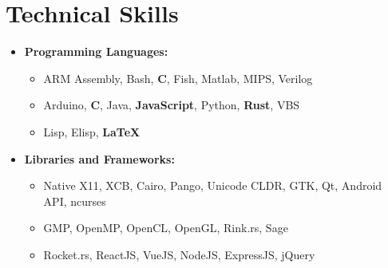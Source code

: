 \documentclass[10pt,letterpaper,sans]{moderncv}
\renewcommand{\_}{\textscale{.7}{\textunderscore}}
\newcommand{\Rplus}{\protect\hspace{-.1em}\protect\raisebox{.35ex}{\smaller{\smaller\textbf{+}}}}
\newcommand{\Cpp}{\mbox{C\Rplus\Rplus}\xspace}
\begin{document}
\section{Technical Skills}
\begin{itemize}
\item \textbf{Programming Languages:}
  \begin{itemize}
    \item {} ARM Assembly, Bash, \textbf{C}, Fish, Matlab, MIPS, Verilog
    \item {} Arduino, \textbf{\Cpp}, Java, \textbf{JavaScript}, Python, \textbf{Rust}, VBS
    \item {} Lisp, Elisp, \textbf{\LaTeX}
  \end{itemize}
\item \textbf{Libraries and Frameworks:} 
  \begin{itemize}
  \item {} Native X11, XCB, Cairo, Pango, Unicode CLDR,
    GTK, Qt, Android API, ncurses
  \item {} GMP, OpenMP, OpenCL, OpenGL, Rink.rs, Sage
  \item {} Rocket.rs, ReactJS, VueJS, NodeJS, ExpressJS, jQuery
  \end{itemize}
\end{itemize}
\end{document}

